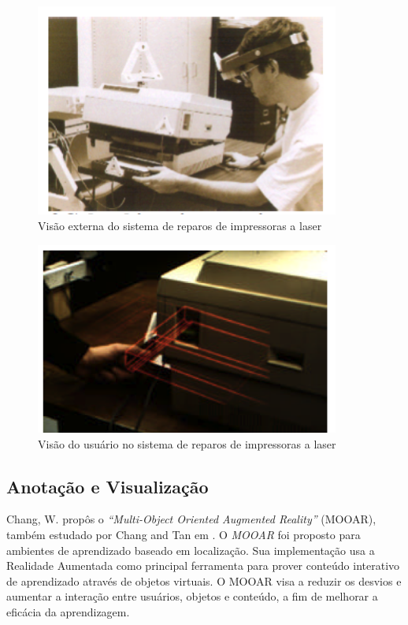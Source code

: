\begin{figure}[h!]
    \centering
    \caption{Visão externa do sistema de reparos de impressoras a laser}
    \label{fig:laser_printer_1}
    \includegraphics[width=10cm]{resources/laser-printer-1.png}
\end{figure}


\begin{figure}[h!]
    \centering
    \caption{Visão do usuário no sistema de reparos de impressoras a laser}
    \label{fig:laser_printer_2}
    \includegraphics[width=10cm]{resources/laser-printer-2.png}
\end{figure}



\subsection{Anotação e Visualização}

Chang, W. \cite{MOOAR} propôs o
\textit{``Multi-Object Oriented Augmented Reality''} (MOOAR), também 
estudado por Chang and Tan em \cite{MOOAR_Study}. O \textit{MOOAR} foi
proposto para ambientes de aprendizado baseado em localização. Sua
implementação usa a Realidade Aumentada como principal ferramenta para
prover conteúdo interativo de aprendizado através de objetos virtuais.
O MOOAR visa a reduzir os desvios e aumentar a interação entre usuários,
objetos e conteúdo, a fim de melhorar a eficácia da aprendizagem.

